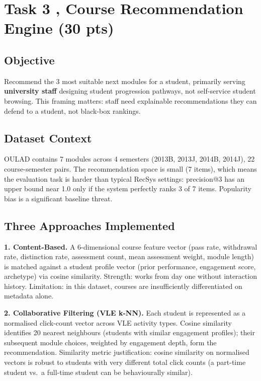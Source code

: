 \documentclass[10pt,a4paper]{article}
\begin{document}
\newpage


\section{Task 3 , Course Recommendation Engine \textnormal{\small(30 pts)}}

\subsection{Objective} Recommend the 3 most suitable next modules for a student, primarily
serving \textbf{university staff} designing student progression pathways, not self-service
student browsing. This framing matters: staff need explainable recommendations they can
defend to a student, not black-box rankings.

\subsection{Dataset Context} OULAD contains 7 modules across 4 semesters (2013B, 2013J,
2014B, 2014J), 22 course-semester pairs. The recommendation space is small (7 items),
which means the evaluation task is harder than typical RecSys settings: precision@3 has an
upper bound near 1.0 only if the system perfectly ranks 3 of 7 items. Popularity bias is a
significant baseline threat.

\subsection{Three Approaches Implemented}

\textbf{1. Content-Based.} A 6-dimensional course feature vector (pass rate, withdrawal
rate, distinction rate, assessment count, mean assessment weight, module length) is matched
against a student profile vector (prior performance, engagement score, archetype) via cosine
similarity. Strength: works from day one without interaction history. Limitation: in this
dataset, courses are insufficiently differentiated on metadata alone.

\textbf{2. Collaborative Filtering (VLE k-NN).} Each student is represented as a
normalised click-count vector across VLE activity types. Cosine similarity identifies 20
nearest neighbours (students with similar engagement profiles); their subsequent module
choices, weighted by engagement depth, form the recommendation. Similarity metric
justification: cosine similarity on normalised vectors is robust to students with very
different total click counts (a part-time student vs.\ a full-time student can be
behaviourally similar).
\end{document}
